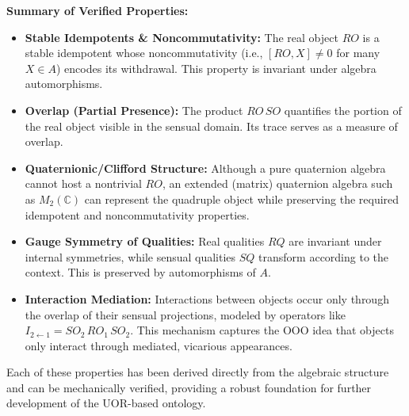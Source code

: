 \documentclass[12pt]{article}
\begin{document}
\textbf{Summary of Verified Properties:}
\begin{itemize}
    \item \textbf{Stable Idempotents \& Noncommutativity:} The real object $RO$ is a stable idempotent whose noncommutativity (i.e., $[RO,X] \neq 0$ for many $X\in A$) encodes its withdrawal. This property is invariant under algebra automorphisms.
    \item \textbf{Overlap (Partial Presence):} The product $RO\,SO$ quantifies the portion of the real object visible in the sensual domain. Its trace serves as a measure of overlap.
    \item \textbf{Quaternionic/Clifford Structure:} Although a pure quaternion algebra cannot host a nontrivial $RO$, an extended (matrix) quaternion algebra such as $M_2(\mathbb{C})$ can represent the quadruple object while preserving the required idempotent and noncommutativity properties.
    \item \textbf{Gauge Symmetry of Qualities:} Real qualities $RQ$ are invariant under internal symmetries, while sensual qualities $SQ$ transform according to the context. This is preserved by automorphisms of $A$.
    \item \textbf{Interaction Mediation:} Interactions between objects occur only through the overlap of their sensual projections, modeled by operators like $I_{2\leftarrow 1} = SO_2\,RO_1\,SO_2$. This mechanism captures the OOO idea that objects only interact through mediated, vicarious appearances.
\end{itemize}

Each of these properties has been derived directly from the algebraic structure and can be mechanically verified, providing a robust foundation for further development of the UOR-based ontology.
\end{document}
